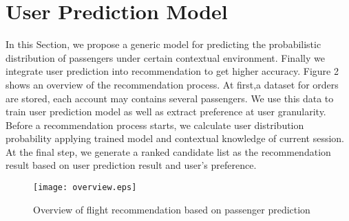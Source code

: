 \documentclass{llncs}
\begin{document}
\section{User Prediction Model}
\label{sec:mod}
In this Section, we propose a generic model for predicting the probabilistic distribution of passengers under certain contextual environment. Finally we integrate user prediction into recommendation to get higher accuracy. Figure 2 shows an overview of the recommendation process. At first,a dataset for orders are stored, each account may contains several passengers. We use this data to train user prediction model as well as extract preference at user granularity. Before a recommendation process starts, we calculate user distribution probability applying trained model and contextual knowledge of current session. At the final step, we generate a ranked candidate list as the recommendation result based on user prediction result and user's preference.\par
\begin{figure}[!hbt]
\centering
\texttt{[image: overview.eps]}
\caption{Overview of flight recommendation based on passenger prediction}
\label{fig:over}
\end{figure}\par
\end{document}
